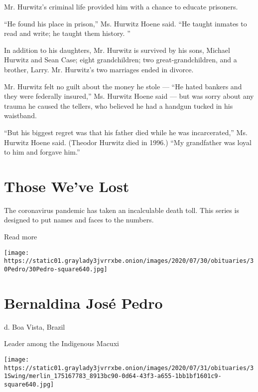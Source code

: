 Mr. Hurwitz's criminal life provided him with a chance to educate
prisoners.

``He found his place in prison,'' Ms. Hurwitz Hoene said. ``He taught
inmates to read and write; he taught them history. ''

In addition to his daughters, Mr. Hurwitz is survived by his sons,
Michael Hurwitz and Sean Case; eight grandchildren; two
great-grandchildren, and a brother, Larry. Mr. Hurwitz's two marriages
ended in divorce.

Mr. Hurwitz felt no guilt about the money he stole --- ``He hated
bankers and they were federally insured,'' Ms. Hurwitz Hoene said ---
but was sorry about any trauma he caused the tellers, who believed he
had a handgun tucked in his waistband.

``But his biggest regret was that his father died while he was
incarcerated,'' Ms. Hurwitz Hoene said. (Theodor Hurwitz died in 1996.)
``My grandfather was loyal to him and forgave him.''

\href{https://www.nytimes3xbfgragh.onion/interactive/2020/obituaries/people-died-coronavirus-obituaries.html?action=click\&pgtype=Article\&state=default\&region=BELOW_MAIN_CONTENT\&context=covid_obits_promo}{}

\hypertarget{those-weve-lost}{%
\section{Those We've Lost}\label{those-weve-lost}}

The coronavirus pandemic has taken an incalculable death toll. This
series is designed to put names and faces to the numbers.

Read more

\texttt{[image: https://static01.graylady3jvrrxbe.onion/images/2020/07/30/obituaries/30Pedro/30Pedro-square640.jpg]}

\hypertarget{bernaldina-josuxe9-pedro}{%
\section{Bernaldina José Pedro}\label{bernaldina-josuxe9-pedro}}

d. Boa Vista, Brazil

Leader among the Indigenous Macuxi

\texttt{[image: https://static01.graylady3jvrrxbe.onion/images/2020/07/31/obituaries/31Swing/merlin\_175167783\_8913bc90-0d64-43f3-a655-1bb1bf1601c9-square640.jpg]}

